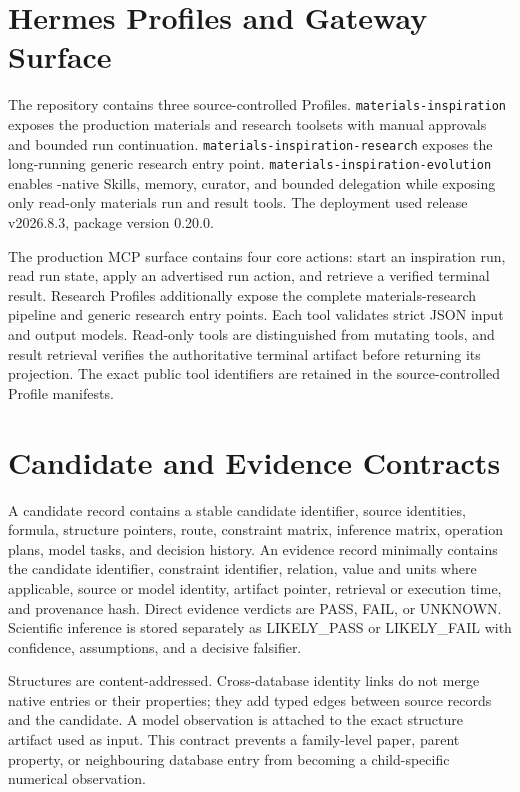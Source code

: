 \appendix

\section{Hermes Profiles and Gateway Surface}
\label{app:hermes}

The repository contains three source-controlled \hermes Profiles.  \texttt{materials-inspiration} exposes the production materials and research toolsets with manual approvals and bounded run continuation.  \texttt{materials-inspiration-research} exposes the long-running generic research entry point.  \texttt{materials-inspiration-evolution} enables \hermes-native Skills, memory, curator, and bounded delegation while exposing only read-only materials run and result tools.  The deployment used \hermes release v2026.8.3, package version 0.20.0.

The production MCP surface contains four core actions: start an inspiration run, read run state, apply an advertised run action, and retrieve a verified terminal result.  Research Profiles additionally expose the complete materials-research pipeline and generic research entry points.  Each tool validates strict JSON input and output models.  Read-only tools are distinguished from mutating tools, and result retrieval verifies the authoritative terminal artifact before returning its projection.  The exact public tool identifiers are retained in the source-controlled Profile manifests.

\section{Candidate and Evidence Contracts}
\label{app:contracts}

A candidate record contains a stable candidate identifier, source identities, formula, structure pointers, route, constraint matrix, inference matrix, operation plans, model tasks, and decision history.  An evidence record minimally contains the candidate identifier, constraint identifier, relation, value and units where applicable, source or model identity, artifact pointer, retrieval or execution time, and provenance hash.  Direct evidence verdicts are PASS, FAIL, or UNKNOWN.  Scientific inference is stored separately as LIKELY\_PASS or LIKELY\_FAIL with confidence, assumptions, and a decisive falsifier.

Structures are content-addressed.  Cross-database identity links do not merge native entries or their properties; they add typed edges between source records and the candidate.  A model observation is attached to the exact structure artifact used as input.  This contract prevents a family-level paper, parent property, or neighbouring database entry from becoming a child-specific numerical observation.

